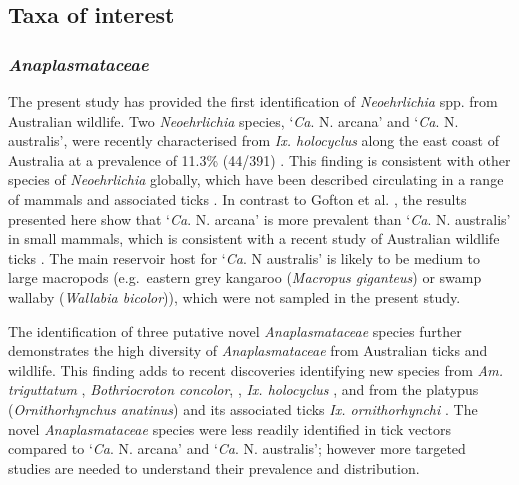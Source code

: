 \documentclass[a4paper, nobind]{templates/ociamthesis}
\begin{document}
\hypertarget{taxa-of-interest-1}{%
\subsection{Taxa of interest}\label{taxa-of-interest-1}}

\hypertarget{anaplasmataceae-2}{%
\subsubsection{\texorpdfstring{\emph{Anaplasmataceae}}{Anaplasmataceae}}\label{anaplasmataceae-2}}

The present study has provided the first identification of \emph{Neoehrlichia} spp. from Australian wildlife. Two \emph{Neoehrlichia} species, `\emph{Ca}. N. arcana' and `\emph{Ca}. N. australis', were recently characterised from \emph{Ix. holocyclus} along the east coast of Australia at a prevalence of 11.3\% (44/391) \autocite{goftonPhylogeneticCharacterisationTwo2016}.
This finding is consistent with other species of \emph{Neoehrlichia} globally, which have been described circulating in a range of mammals and associated ticks \autocite{kawaharaUltrastructurePhylogeneticAnalysis2004,mullerCandidatusNeoehrlichiaChilensis2018}.
In contrast to Gofton et al. \autocite*{goftonPhylogeneticCharacterisationTwo2016}, the results presented here show that `\emph{Ca}. N. arcana' is more prevalent than `\emph{Ca}. N. australis' in small mammals, which is consistent with a recent study of Australian wildlife ticks \autocite{eganBacterialCommunityProfiling2020}.
The main reservoir host for `\emph{Ca}. N australis' is likely to be medium to large macropods (e.g.~eastern grey kangaroo (\emph{Macropus giganteus}) or swamp wallaby (\emph{Wallabia bicolor})), which were not sampled in the present study.

The identification of three putative novel \emph{Anaplasmataceae} species further demonstrates the high diversity of \emph{Anaplasmataceae} from Australian ticks and wildlife.
This finding adds to recent discoveries identifying new species from \emph{Am. triguttatum} \autocite{goftonDetectionPhylogeneticCharacterisation2017}, \emph{Bothriocroton concolor}, \autocite{lohIdentificationCharacterisationMicroorganisms2018}, \emph{Ix. holocyclus} \autocite{goftonPhylogeneticCharacterisationTwo2016}, and from the platypus (\emph{Ornithorhynchus anatinus}) and its associated ticks \emph{Ix. ornithorhynchi} \autocite{goftonNovelEhrlichiaSpecies2018}.
The novel \emph{Anaplasmataceae} species were less readily identified in tick vectors compared to `\emph{Ca}. N. arcana' and `\emph{Ca}. N. australis'; however more targeted studies are needed to understand their prevalence and distribution.
\end{document}

